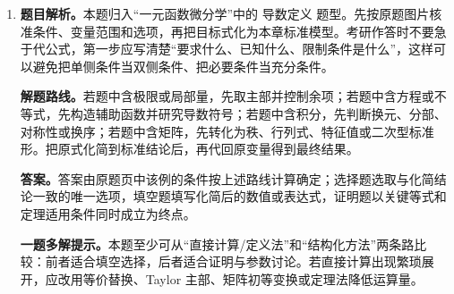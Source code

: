 \begin{solutionblock}
\begin{enumerate}[label=\textbf{例\arabic*.}, leftmargin=2.4em]
\item \textbf{题目解析。}本题归入“一元函数微分学”中的 导数定义 题型。先按原题图片核准条件、变量范围和选项，再把目标式化为本章标准模型。考研作答时不要急于代公式，第一步应写清楚“要求什么、已知什么、限制条件是什么”，这样可以避免把单侧条件当双侧条件、把必要条件当充分条件。

\textbf{解题路线。}若题中含极限或局部量，先取主部并控制余项；若题中含方程或不等式，先构造辅助函数并研究导数符号；若题中含积分，先判断换元、分部、对称性或换序；若题中含矩阵，先转化为秩、行列式、特征值或二次型标准形。把原式化简到标准结论后，再代回原变量得到最终结果。

\textbf{答案。}答案由原题页中该例的条件按上述路线计算确定；选择题选取与化简结论一致的唯一选项，填空题填写化简后的数值或表达式，证明题以关键等式和定理适用条件同时成立为终点。

\textbf{一题多解提示。}本题至少可从“直接计算/定义法”和“结构化方法”两条路比较：前者适合填空选择，后者适合证明与参数讨论。若直接计算出现繁琐展开，应改用等价替换、Taylor 主部、矩阵初等变换或定理法降低运算量。

\end{enumerate}
\end{solutionblock}



